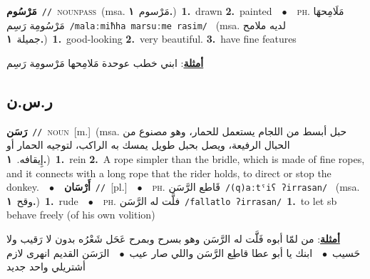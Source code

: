 \documentclass[10pt,a4paper,twoside]{article} %
\begin{document}
\begin{multicols}{2}
{\setlength\topsep{0pt}\textbf{\foreignlanguage{arabic}{مَرْسُوم}}\ {\color{gray}\texttt{//}\color{black}}\ \textsc{noun\textunderscore pass}\ \color{gray}(msa. \foreignlanguage{arabic}{مَرْسوم}~\foreignlanguage{arabic}{\textbf{١.}})\color{black}\ \textbf{1.}~drawn  \textbf{2.}~painted\ \ $\bullet$\ \ \textsc{ph.} \color{gray} \foreignlanguage{arabic}{مَلَامِحهَا مَرْسُومِة رَسِم}\color{black}\ {\color{gray}\texttt{/{\sffamily malaːmiħha marsuːme rasim}/}\color{black}}\ \color{gray} (msa. \foreignlanguage{arabic}{لديه ملامح جميلة}~\foreignlanguage{arabic}{\textbf{١.}})\color{black}\ \textbf{1.}~good-looking  \textbf{2.}~very beautiful.  \textbf{3.}~have fine features\  \begin{flushright}\color{gray}\foreignlanguage{arabic}{\textbf{\underline{\foreignlanguage{arabic}{أمثلة}}}: ابني خطب عوحدة مَلامِحها مَرْسومِة رَسِم}\end{flushright}\color{black}} \vspace{2mm}

\vspace{-3mm}
\subsection*{\color{blue}\foreignlanguage{arabic}{ر.س.ن}\color{blue}{}} 

{\setlength\topsep{0pt}\textbf{\foreignlanguage{arabic}{رَسَن}}\ {\color{gray}\texttt{//}\color{black}}\ \textsc{noun}\ [m.]\ \color{gray}(msa. \foreignlanguage{arabic}{حبل أبسط من اللجام يستعمل للحمار، وهو مصنوع من الحبال الرفيعة، ويصل بحبل طويل يمسك به الراكب، لتوجيه الحمار أو إِيقافه.}~\foreignlanguage{arabic}{\textbf{١.}})\color{black}\ \textbf{1.}~rein  \textbf{2.}~A rope simpler than the bridle, which is made of fine ropes, and it connects with a long rope that the rider holds, to direct or stop the donkey.\ \ $\bullet$\ \ \setlength\topsep{0pt}\textbf{\foreignlanguage{arabic}{أَرْسَان}}\ {\color{gray}\texttt{//}\color{black}}\ [pl.]\ \ $\bullet$\ \ \textsc{ph.} \color{gray} \foreignlanguage{arabic}{قَاطع الرَّسَن}\color{black}\ {\color{gray}\texttt{/{\sffamily (q)aːtˤiʕ ʔirrasan}/}\color{black}}\ \color{gray} (msa. \foreignlanguage{arabic}{وقح}~\foreignlanguage{arabic}{\textbf{١.}})\color{black}\ \textbf{1.}~rude\ \ $\bullet$\ \ \textsc{ph.} \color{gray} \foreignlanguage{arabic}{فلَّت له الرَّسَن}\color{black}\ {\color{gray}\texttt{/{\sffamily fallatlo ʔirrasan}/}\color{black}}\ \textbf{1.}~to let sb behave freely (of his own volition)\  \begin{flushright}\color{gray}\foreignlanguage{arabic}{\textbf{\underline{\foreignlanguage{arabic}{أمثلة}}}: من لمّا أبوه فَلََّت له الرَّسَن وهو بسرح وبمرح عَحَل شَعْرُه بدون لا رَقيب ولا حَسيب\ $\bullet$\ \  ابنك يا أبو عطا قاطِع الرَّسَن واللي صار عيب\ $\bullet$\ \  الرَسَن القديم انهرى لازم أشتريلي واحد جديد}\end{flushright}\color{black}} \vspace{2mm}


\end{multicols}
\end{document}

